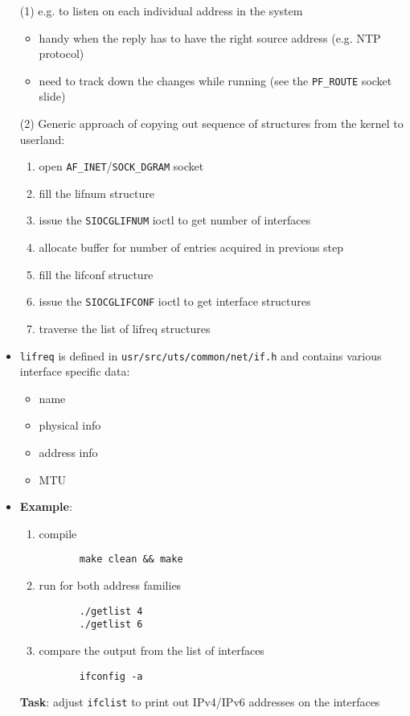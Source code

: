 \begin{itemize}
  \item[(1)] e.g. to listen on each individual address in the system
  \begin{itemize}
    \item handy when the reply has to have the right source address
      (e.g. NTP protocol)
    \item need to track down the changes while running (see the
      \texttt{PF\_ROUTE} socket slide)
  \end{itemize}
  \item[(2)] Generic approach of copying out sequence of structures from
    the kernel to userland:
\begin{enumerate}
  \item open \texttt{AF\_INET}/\texttt{SOCK\_DGRAM} socket
  \item fill the lifnum structure
  \item issue the \texttt{SIOCGLIFNUM} ioctl to get number of interfaces
  \item allocate buffer for number of entries acquired in previous step
  \item fill the lifconf structure
  \item issue the \texttt{SIOCGLIFCONF} ioctl to get interface structures
  \item traverse the list of lifreq structures
\end{enumerate}
  \item \texttt{lifreq} is defined in \texttt{usr/src/uts/common/net/if.h}
and contains various interface specific data:
\begin{itemize}
  \item name
  \item physical info
  \item address info
  \item MTU
\end{itemize}
  \item {\bf Example}: 
\begin{enumerate}
	\item compile
\begin{verbatim}
	   make clean && make
\end{verbatim}
	\item run for both address families
\begin{verbatim}
	   ./getlist 4
	   ./getlist 6
\end{verbatim}
	\item compare the output from the list of interfaces
\begin{verbatim}
	   ifconfig -a
\end{verbatim}
\end{enumerate}
{\bf Task}: adjust \texttt{ifclist} to print out IPv4/IPv6 addresses
  on the interfaces
\end{itemize}


